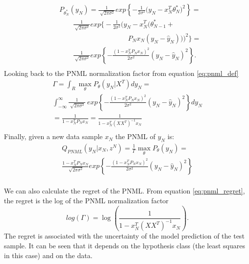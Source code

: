 \documentclass[letterpaper, 10 pt, conference]{ieeeconf}  %
\begin{document}
\begin{equation}
\begin{split}
&P_{\theta_N ^*}(y_N) 
=\frac{1}{\sqrt[]{2\pi\sigma^2}}exp\left\{-\frac{1}{2\sigma^2}\big(y_N- x_N^T\theta ^*_N \big)^2\right\} = \\
& \qquad \frac{1}{\sqrt[]{2\pi\sigma^2}}exp\bigg\{-\frac{1}{2\sigma^2}\big(y_N - x_N^T \big(\theta^*_{N-1} + \\ 
& \qquad \qquad \qquad \qquad \qquad P_N x_N (y_N -\hat{y}_N) \big) \big)^2\bigg\} = \\
& \qquad \frac{1}{\sqrt[]{2\pi\sigma^2}}
exp\left\{-\frac{(1 - x_N^T P_N x_N )^2 }{2\sigma^2}\left(y_N-\hat{y}_N \right)^2\right\}.  \\
\end{split}
\end{equation}
Looking back to the PNML normalization factor from equation \ref{eq:pnml_def}
\begin{multline}
\Gamma = \int_R \max_{\theta} P_\theta(y_N|X^T)dy_N = \\
\int_{-\infty}^{\infty} \frac{1}{\sqrt[]{2\pi\sigma^2}}
\ exp\left\{-\frac{(1 - x_N^T P_N x_N )^2 }{2\sigma^2}
\left(y_N- \hat{y}_N \right)^2\right\} dy_N\\ 
=\frac{1}{1 - x_N^T P_N x_N } 
=\frac{1}{1 - x_N^T (XX^T)^{-1} x_N } \\
\end{multline}
Finally, given a new data sample $x_N$ the PNML of $y_N$ is:
\begin{multline}
Q_{PNML}(y_N | x_N, z^N) = \frac{1}{\Gamma}\max_{\theta}P_{\theta}(y_N) = \\
\frac{1 - x_N^T P_N x_N }{\sqrt[]{2\pi\sigma^2}}
exp\left\{-\frac{(1 - x_N^T P_N x_N )^2 }{2\sigma^2}\left(y_N-\hat{y}_N \right)^2\right\} \\
\end{multline}

We can also calculate the regret of the PNML. From equation \ref{eq:pnml_regret}, the regret is the log of the PNML normalization factor
\begin{equation} \label{eq:regret}
log(\Gamma) = \log\left(\frac{1}{1 - x_N^T (XX^T)^{-1} x_N } \right).
\end{equation}
The regret is associated with the uncertainty of the model prediction of the test sample. It can be seen that it depends on the hypothesis class (the least squares in this case) and on the data.
\end{document}
